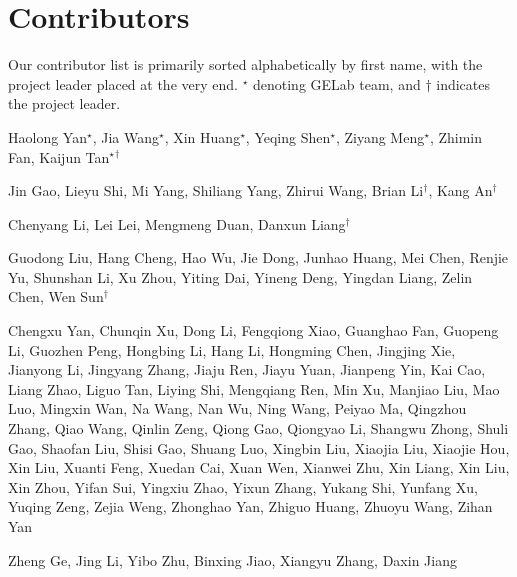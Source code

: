 \newpage
\section*{Contributors}

Our contributor list is primarily sorted alphabetically by first name, with the project leader placed at the very end. $^\star$ denoting GELab team, and $\dagger$ indicates the project leader. 


Haolong Yan$^\star$, Jia Wang$^\star$, Xin Huang$^\star$, Yeqing Shen$^\star$, Ziyang Meng$^\star$, Zhimin Fan, Kaijun Tan$^\star$$^\dagger$

Jin Gao, Lieyu Shi, Mi Yang, Shiliang Yang, Zhirui Wang, Brian Li$^\dagger$, Kang An$^\dagger$

Chenyang Li, Lei Lei, Mengmeng Duan, Danxun Liang$^\dagger$


Guodong Liu, Hang Cheng, Hao Wu, Jie Dong, Junhao Huang, Mei Chen, Renjie Yu, Shunshan Li, Xu Zhou, Yiting Dai, Yineng Deng, Yingdan Liang, Zelin Chen, Wen Sun$^\dagger$


Chengxu Yan, Chunqin Xu, Dong Li, Fengqiong Xiao, Guanghao Fan, Guopeng Li, Guozhen Peng, Hongbing Li, Hang Li, Hongming Chen, Jingjing Xie, Jianyong Li, Jingyang Zhang, Jiaju Ren, Jiayu Yuan, Jianpeng Yin, Kai Cao, Liang Zhao, Liguo Tan, Liying Shi, Mengqiang Ren, Min Xu, Manjiao Liu, Mao Luo, Mingxin Wan, Na Wang, Nan Wu, Ning Wang, Peiyao Ma, Qingzhou Zhang, Qiao Wang, Qinlin Zeng, Qiong Gao, Qiongyao Li, Shangwu Zhong, Shuli Gao, Shaofan Liu, Shisi Gao, Shuang Luo, Xingbin Liu, Xiaojia Liu, Xiaojie Hou, Xin Liu, Xuanti Feng, Xuedan Cai, Xuan Wen, Xianwei Zhu, Xin Liang, Xin Liu, Xin Zhou, Yifan Sui, Yingxiu Zhao, Yixun Zhang, Yukang Shi, Yunfang Xu, Yuqing Zeng, Zejia Weng, Zhonghao Yan, Zhiguo Huang, Zhuoyu Wang, Zihan Yan

Zheng Ge, Jing Li, Yibo Zhu, Binxing Jiao, Xiangyu Zhang, Daxin Jiang